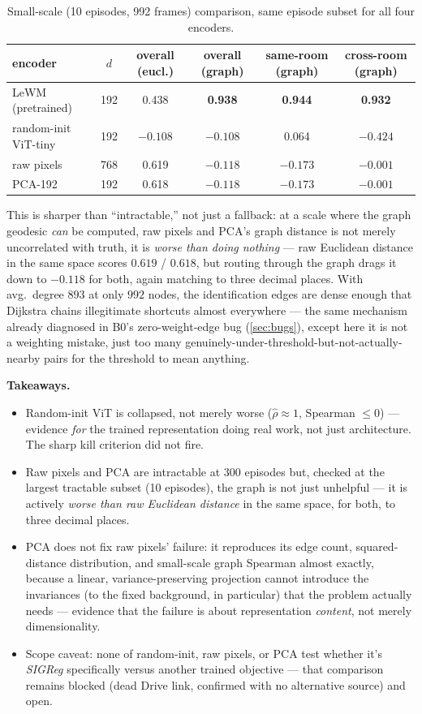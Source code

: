 \documentclass[11pt]{article}
\begin{document}
\begin{table}[h]
\centering
\caption{Small-scale (10 episodes, 992 frames) comparison, same episode subset for all four
encoders.}
\begin{tabular}{lccccc}
\toprule
encoder & $d$ & overall (eucl.) & overall (graph) & same-room (graph) & cross-room (graph) \\
\midrule
LeWM (pretrained)     & 192 & 0.438 & \textbf{0.938} & \textbf{0.944} & \textbf{0.932} \\
random-init ViT-tiny  & 192 & $-0.108$ & $-0.108$ & 0.064 & $-0.424$ \\
raw pixels            & 768 & 0.619 & $-0.118$ & $-0.173$ & $-0.001$ \\
PCA-192               & 192 & 0.618 & $-0.118$ & $-0.173$ & $-0.001$ \\
\bottomrule
\end{tabular}
\end{table}

This is sharper than ``intractable,'' not just a fallback: at a scale where the graph geodesic
\emph{can} be computed, raw pixels and PCA's graph distance is not merely uncorrelated with truth,
it is \emph{worse than doing nothing} --- raw Euclidean distance in the same space scores $0.619$
/ $0.618$, but routing through the graph drags it down to $-0.118$ for both, again matching to
three decimal places. With avg.\ degree $893$ at only $992$ nodes, the identification edges are
dense enough that Dijkstra chains illegitimate shortcuts almost everywhere --- the same mechanism
already diagnosed in B0's zero-weight-edge bug (\cref{sec:bugs}), except here it is not a
weighting mistake, just too many genuinely-under-threshold-but-not-actually-nearby pairs for the
threshold to mean anything.

\textbf{Takeaways.}
\begin{itemize}[leftmargin=1.4em,itemsep=2pt]
\item Random-init ViT is collapsed, not merely worse ($\hat\rho\approx1$, Spearman $\le 0$) ---
evidence \emph{for} the trained representation doing real work, not just architecture. The sharp
kill criterion did not fire.
\item Raw pixels and PCA are intractable at 300 episodes but, checked at the largest tractable
subset (10 episodes), the graph is not just unhelpful --- it is actively \emph{worse than raw
Euclidean distance} in the same space, for both, to three decimal places.
\item PCA does not fix raw pixels' failure: it reproduces its edge count, squared-distance
distribution, and small-scale graph Spearman almost exactly, because a linear, variance-preserving
projection cannot introduce the invariances (to the fixed background, in particular) that the
problem actually needs --- evidence that the failure is about representation \emph{content}, not
merely dimensionality.
\item Scope caveat: none of random-init, raw pixels, or PCA test whether it's \emph{SIGReg}
specifically versus another trained objective --- that comparison remains blocked (dead Drive
link, confirmed with no alternative source) and open.
\end{itemize}
\end{document}
